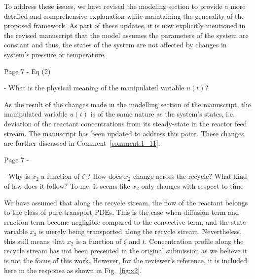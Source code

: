 \documentclass[11pt,answers]{exam}
\begin{document}
\begin{questions}
\begin{solutionorbox}
        To address these issues, we have revised the modeling section to provide a more detailed and comprehensive explanation while maintaining the generality of the proposed framework. As part of these updates, it is now explicitly mentioned in the revised manuscript that the model assumes the parameters of the system are constant and thus, the states of the system are not affected by changes in system's pressure or temperature.
    \end{solutionorbox}


    \question Page 7 - Eq (2)

    - What is the physical meaning of the manipulated variable $u(t)$?

    \begin{solutionorbox} \label{comment:1_5}
        As the result of the changes made in the modelling section of the manuscript, the manipulated variable $u(t)$ is of the same nature as the system's states, i.e. deviation of the reactant concentrations from its steady-state in the reactor feed stream. The manuscript has been updated to address this point. These changes are further discussed in Comment~\ref{comment:1_11}.
    \end{solutionorbox}


    \question Page 7 - 

    - Why is $x_2$ a function of $\zeta$ ? How does $x_2$ change across the recycle? What kind of law does it follow? To me, it seems like $x_2$ only changes with respect to time

    \begin{solutionorbox} \label{comment:1_6}
        We have assumed that along the recycle stream, the flow of the reactant belongs to the class of pure transport PDEs. This is the case when diffusion term and reaction term become negligible compared to the convective term, and the state variable $x_2$ is merely being transported along the recycle stream. Nevertheless, this still means that $x_2$ is a function of $\zeta$ and $t$. Concentration profile along the recycle stream has not been presented in the original submission as we believe it is not the focus of this work. However, for the reviewer's reference, it is included here in the response as shown in Fig.~\ref{fig:x2}.
    \end{solutionorbox}


\end{questions}
\end{document}

